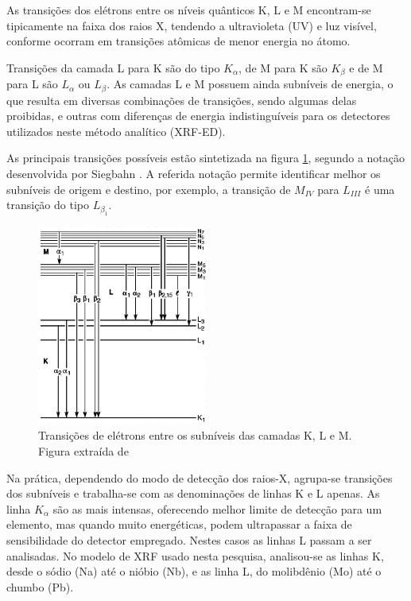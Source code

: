 As transições dos elétrons entre os níveis quânticos K, L e M encontram-se 
tipicamente na faixa dos raios X, tendendo a ultravioleta (UV) e luz visível,
conforme ocorram em transições atômicas de menor energia no átomo.

Transições da camada L para K são do tipo $K_{\alpha}$, de M para K 
são $K_{\beta}$ e de M para L são $L_{\alpha}$ ou $L_{\beta}$. 
As camadas L e M possuem ainda subníveis de energia, o que resulta em diversas
combinações de transições, sendo algumas delas proibidas, e outras 
com diferenças de energia indistinguíveis para os detectores utilizados 
neste método analítico (XRF-ED).

As principais transições possíveis estão sintetizada na figura \ref{fig:siegbahn}, 
segundo a notação desenvolvida por Siegbahn \citep{jenkins1991}. A referida 
notação permite identificar melhor os subníveis de origem e destino, por exemplo, 
a transição de $M_{IV}$ para $L_{III}$ é uma transição do tipo $L_{\beta_1}$. 

\begin{figure}[H]
  \centering 
  \includegraphics[width=0.5\textwidth]{../inputs/images/Siegbahn.jpg}
  \caption{Transições de elétrons entre os subníveis das camadas K, L e M. 
           Figura extraída de \citet{jenkins1991} \label{fig:siegbahn}}
\end{figure}

Na prática, dependendo do modo de detecção dos raios-X, agrupa-se transições 
dos subníveis e trabalha-se com as denominações de linhas K e L apenas. As linha
$K_{\alpha}$ são as mais intensas, oferecendo melhor limite de detecção
para um elemento, mas quando muito energéticas, podem ultrapassar a
faixa de sensibilidade do detector empregado. Nestes casos as linhas L passam a 
ser analisadas. No modelo de XRF usado nesta pesquisa, analisou-se as linhas K, 
desde o sódio (Na) até o nióbio (Nb), e as linha L, do molibdênio (Mo) até o chumbo (Pb).  
 
